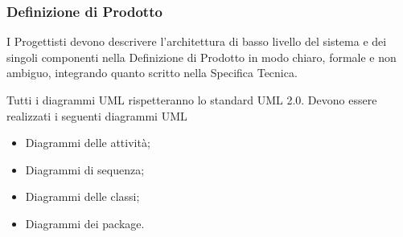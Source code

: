 \subsubsection{Definizione di Prodotto}
\label{}
I Progettisti devono descrivere l'architettura di basso livello del sistema e dei singoli componenti nella Definizione di Prodotto in modo chiaro, formale e non ambiguo, integrando quanto scritto nella Specifica Tecnica.

\label{}
Tutti i diagrammi UML rispetteranno lo standard UML 2.0.
Devono essere realizzati i seguenti diagrammi UML
\begin{itemize}
\item Diagrammi delle attività;
\item Diagrammi di sequenza;
\item Diagrammi delle classi;
\item Diagrammi dei package.
\end{itemize}

